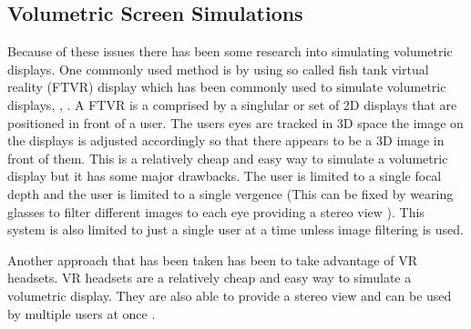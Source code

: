 \subsection{Volumetric Screen Simulations}
Because of these issues there has been some research into simulating volumetric displays. One commonly used method is by using so called fish tank virtual reality (FTVR) display \cite{10.1145/169059.169066} which has been commonly used to simulate volumetric displays, \cite{10.1145/3281505.3281540}, \cite{Zabarauskas2012}. A FTVR is a comprised by a singlular or set of 2D displays that are positioned in front of a user. The users eyes are tracked in 3D space the image on the displays is adjusted accordingly so that there appears to be a 3D image in front of them. This is a relatively cheap and easy way to simulate a volumetric display but it has some major drawbacks. The user is limited to a single focal depth and the user is limited to a single vergence (This can be fixed by wearing glasses to filter different images to each eye providing a stereo view \cite{5701756}). This system is also limited to just a single user at a time unless image filtering is used. 

Another approach that has been taken has been to take advantage of VR headsets. VR headsets are a relatively cheap and easy way to simulate a volumetric display. They are also able to provide a stereo view and can be used by multiple users at once \cite{10.1145/3290605.3300763}.